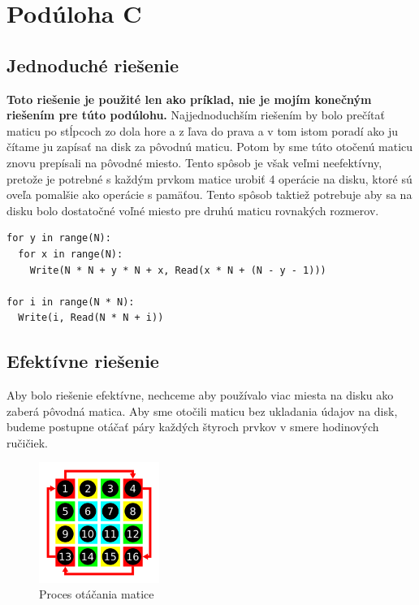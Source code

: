 \documentclass{article}
\begin{document}
\section*{Podúloha C}

\subsection*{Jednoduché riešenie}

\textbf{Toto riešenie je použité len ako príklad, nie je mojím konečným riešením pre túto podúlohu.}
\newline
Najjednoduchším riešením by bolo prečítať maticu po stĺpcoch zo dola hore a z ľava do prava a v tom istom poradí ako ju čítame ju zapísať na disk za pôvodnú maticu. Potom by sme túto otočenú maticu znovu prepísali na pôvodné miesto. Tento spôsob je však veľmi neefektívny, pretože je potrebné s každým prvkom matice urobiť 4 operácie na disku, ktoré sú oveľa pomalšie ako operácie s pamäťou. Tento spôsob taktiež potrebuje aby sa na disku bolo dostatočné voľné miesto pre druhú maticu rovnakých rozmerov.

\begin{lstlisting}
for y in range(N):
  for x in range(N):
    Write(N * N + y * N + x, Read(x * N + (N - y - 1)))

for i in range(N * N):
  Write(i, Read(N * N + i))
\end{lstlisting}

\subsection*{Efektívne riešenie}

Aby bolo riešenie efektívne, nechceme aby používalo viac miesta na disku ako zaberá pôvodná matica.
Aby sme otočili maticu bez ukladania údajov na disk, budeme postupne otáčať páry každých štyroch prvkov v smere hodinových ručičiek.

\begin{figure}[h]
  \centering
  \includegraphics[width=0.35\textwidth]{process}
  \caption{Proces otáčania matice}
\end{figure}
\end{document}
